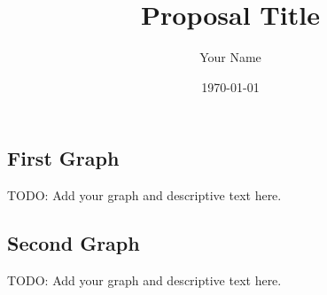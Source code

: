 \documentclass[11pt]{article} %
\title{Proposal Title}
\author{Your Name}
\date{\today}
\begin{document}
\maketitle


\subsection*{First Graph}
\label{sec:graph1}

TODO: Add your graph and descriptive text  here.


\subsection*{Second Graph}
\label{sec:graph2}

TODO: Add your graph and descriptive text here.
\end{document}
